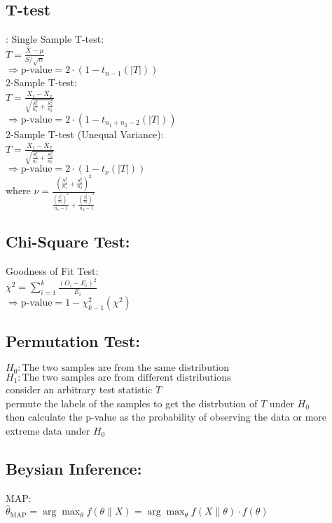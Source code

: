 \subsection{T-test}:
Single Sample T-test:\\
$T = \frac{\bar{X} - \mu}{S / \sqrt{n}}$\\
$\Rightarrow \text{p-value} = 2 \cdot (1 - t_{n-1}(|T|))$\\
2-Sample T-test:\\
$T = \frac{\bar{X}_1 - \bar{X}_2}{\sqrt{\frac{S_1^2}{n_1} + \frac{S_2^2}{n_2}}}$\\
$\Rightarrow \text{p-value} = 2 \cdot (1 - t_{n_1 + n_2 - 2}(|T|))$\\
2-Sample T-test (Unequal Variance):\\
$T = \frac{\bar{X}_1 - \bar{X}_2}{\sqrt{\frac{S_1^2}{n_1} + \frac{S_2^2}{n_2}}}$\\
$\Rightarrow \text{p-value} = 2 \cdot (1 - t_{\nu}(|T|))$\\
where $\nu = \frac{\left(\frac{S_1^2}{n_1} + \frac{S_2^2}{n_2}\right)^2}{\frac{\left(\frac{S_1^2}{n_1}\right)^2}{n_1 - 1} + \frac{\left(\frac{S_2^2}{n_2}\right)^2}{n_2 - 1}}$\\

\subsection{Chi-Square Test:}
Goodness of Fit Test:\\
$\chi^2 = \sum_{i=1}^{k} \frac{(O_i - E_i)^2}{E_i}$\\
$\Rightarrow \text{p-value} = 1 - \chi^2_{k-1}(\chi^2)$\\

\subsection{Permutation Test:}
$H_0: \text{The two samples are from the same distribution}$\\
$H_1: \text{The two samples are from different distributions}$\\
consider an arbitrary test statistic $T$\\
permute the labels of the samples to get the distrbution of $T$ under $H_0$\\
then calculate the p-value as the probability of observing the data or more extreme data under $H_0$\\

\subsection{Beysian Inference:}
MAP: \\
$\hat{\theta}_{\text{MAP}} = \arg \max_{\theta} f(\theta \| X) = \arg \max_{\theta} f(X \| \theta) \cdot f(\theta)$\\

